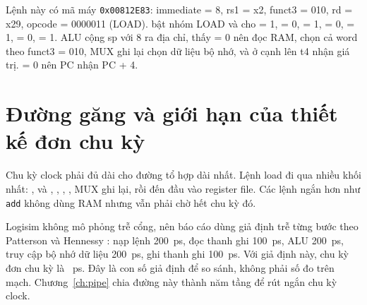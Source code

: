 \documentclass[../report.tex]{subfiles}
\begin{document}
Lệnh này có mã máy \texttt{0x00812E83}: immediate = 8, rs1 = x2, funct3 = 010, rd = x29, opcode = 0000011 (LOAD).
 bật nhóm LOAD và cho  = 1,  = 0,  = 1,  = 0,
 = 1,  = 0,  = 1. ALU cộng sp với 8 ra địa chỉ,  thấy
 = 0 nên đọc RAM,  chọn cả word theo funct3 = 010, MUX ghi lại chọn dữ liệu bộ nhớ, và ở
cạnh lên t4 nhận giá trị.  = 0 nên PC nhận PC + 4.

\section{Đường găng và giới hạn của thiết kế đơn chu kỳ}\label{sec:critical}

Chu kỳ clock phải đủ dài cho đường tổ hợp dài nhất. Lệnh load đi qua nhiều khối nhất: , 
và , , , , MUX ghi lại, rồi đến đầu vào register file. Các lệnh
ngắn hơn như \texttt{add} không dùng RAM nhưng vẫn phải chờ hết chu kỳ đó.

Logisim không mô phỏng trễ cổng, nên báo cáo dùng giả định trễ từng bước theo Patterson và Hennessy
\cite[ch.~4]{patterson}: nạp lệnh 200~ps, đọc thanh ghi 100~ps, ALU 200~ps, truy cập bộ nhớ dữ liệu 200~ps, ghi thanh
ghi 100~ps. Với giả định này, chu kỳ đơn chu kỳ là \resTSingle~ps. Đây là con số giả định để so sánh, không phải
số đo trên mạch. Chương~\ref{ch:pipe} chia đường này thành năm tầng để rút ngắn chu kỳ clock.
\end{document}
